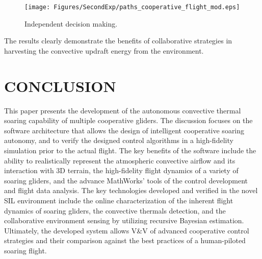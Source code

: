 \documentclass[letterpaper, 10 pt, conference]{ieeeconf}  %
\newcommand{\squeezeup}{\vspace{-1.0mm}}
\begin{document}
\begin{figure}[thpb]
  \centering
  \texttt{[image: Figures/SecondExp/paths\_cooperative\_flight\_mod.eps]}
  \caption{Independent decision making.}
  \label{fig:CoopFlightIndependentDecision}
\end{figure}
The results clearly demonstrate the benefits of collaborative strategies in harvesting the convective updraft energy from the environment.

\section*{CONCLUSION}
This paper presents the development of the autonomous convective thermal soaring capability of multiple cooperative gliders.
The discussion focuses on the software architecture that allows the design of intelligent cooperative soaring autonomy, and to verify the designed control algorithms in a high-fidelity simulation prior to the actual flight. The key benefits of the software include the ability to realistically represent the atmospheric convective airflow and its interaction with 3D terrain, the high-fidelity flight dynamics of a variety of soaring gliders, and the advance MathWorks' tools of the control development and flight data analysis. The key technologies developed and verified in the novel SIL environment include the online characterization of the inherent flight dynamics of soaring gliders, the convective thermals detection, and the collaborative environment sensing by utilizing recursive Bayesian estimation. Ultimately, the developed system allows V\&V of advanced cooperative control strategies and their comparison against the best practices of a human-piloted soaring flight.




\end{document}
